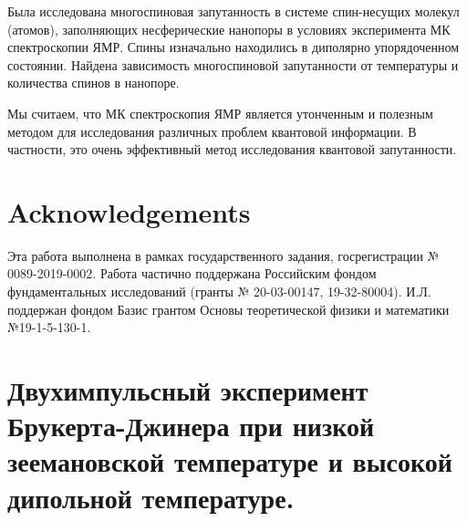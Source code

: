 \documentclass[review]{elsarticle}
\begin{document}
Была исследована многоспиновая запутанность в системе спин-несущих молекул (атомов), заполняющих несферические нанопоры в условиях эксперимента МК спектроскопии ЯМР.
Спины изначально находились в диполярно упорядоченном состоянии.
Найдена зависимость многоспиновой запутанности от температуры и количества спинов в нанопоре.

Мы считаем, что МК спектроскопия ЯМР является утонченным и полезным методом для исследования различных проблем квантовой информации.
В частности, это очень эффективный метод исследования квантовой запутанности.


\section{Acknowledgements}
Эта работа выполнена в рамках государственного задания, госрегистрации № 0089-2019-0002. 
Работа частично поддержана Российским фондом фундаментальных исследований (гранты № 20-03-00147, 19-32-80004).
И.Л. поддержан фондом Базис грантом Основы теоретической физики и математики №19-1-5-130-1.



\appendix
\section{Двухимпульсный эксперимент Брукерта-Джинера при низкой зеемановской температуре и высокой дипольной температуре.}
\end{document}
